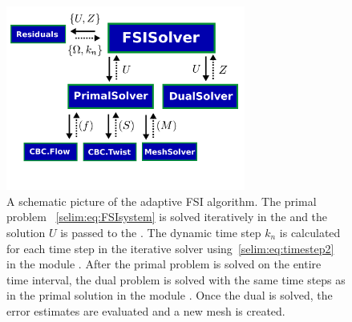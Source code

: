 \begin{figure}[tbp!]
  \begin{center}
    \includegraphics[width=0.7\textwidth]{chapters/selim/pdf/adaptive.pdf}
    \caption{A schematic picture of the adaptive FSI algorithm. The primal
      problem ~\eqref{selim:eq:FSIsystem} is solved iteratively in the
       and the solution $U$ is passed to the
      . The dynamic time step $k_n$ is calculated for
      each time step in the iterative solver 
      using~\eqref{selim:eq:timestep2} in the module
      . After the primal problem is solved on the entire
      time interval, the dual problem is solved with the same time steps
      as in the primal solution in the module . Once
      the dual is solved, the error estimates are evaluated and a new mesh
      is created.}
    \label{selim:fig:adaptiveMAP}
  \end{center}
\end{figure}

